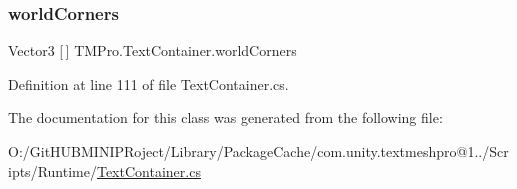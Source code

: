 \mbox{\label{class_t_m_pro_1_1_text_container_a0beb8af09797cfe92345a48378405cea}} 
\subsubsection{\texorpdfstring{worldCorners}{worldCorners}}
{\footnotesize\ttfamily Vector3 \mbox{[}$\,$\mbox{]} T\+M\+Pro.\+Text\+Container.\+world\+Corners\hspace{0.3cm}{\ttfamily [get]}}



Definition at line 111 of file Text\+Container.\+cs.



The documentation for this class was generated from the following file\+:\begin{DoxyCompactItemize}
\item 
O\+:/\+Git\+H\+U\+B\+M\+I\+N\+I\+P\+Roject/\+Library/\+Package\+Cache/com.\+unity.\+textmeshpro@1../\+Scripts/\+Runtime/\mbox{\hyperlink{_text_container_8cs}{Text\+Container.\+cs}}\end{DoxyCompactItemize}
